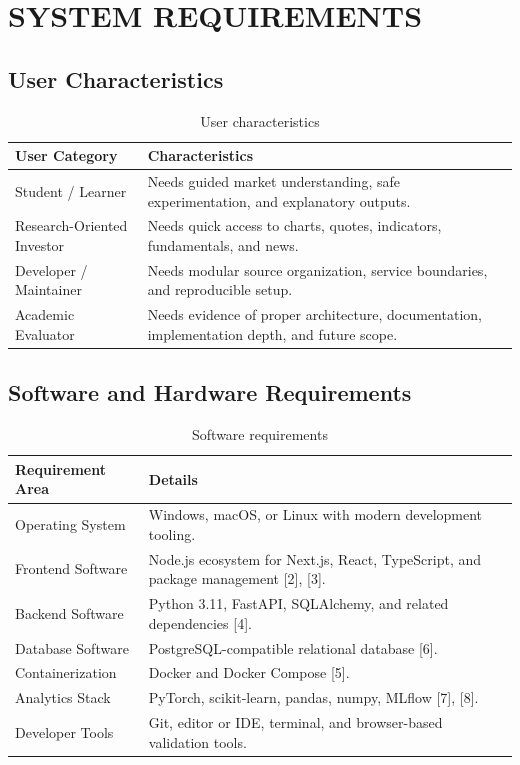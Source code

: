 \documentclass[12pt,a4paper]{report}
\begin{document}
\section{SYSTEM REQUIREMENTS}
\subsection{User Characteristics}
\begin{table}[H]
\centering
\caption{User characteristics}
\begin{tabularx}{\textwidth}{>{\raggedright\arraybackslash}p{1.9in} X}
\toprule
\textbf{User Category} & \textbf{Characteristics} \\
\midrule
Student / Learner & Needs guided market understanding, safe experimentation, and explanatory outputs. \\
Research-Oriented Investor & Needs quick access to charts, quotes, indicators, fundamentals, and news. \\
Developer / Maintainer & Needs modular source organization, service boundaries, and reproducible setup. \\
Academic Evaluator & Needs evidence of proper architecture, documentation, implementation depth, and future scope. \\
\bottomrule
\end{tabularx}
\end{table}

\subsection{Software and Hardware Requirements}
\begin{table}[H]
\centering
\caption{Software requirements}
\begin{tabularx}{\textwidth}{>{\raggedright\arraybackslash}p{2in} X}
\toprule
\textbf{Requirement Area} & \textbf{Details} \\
\midrule
Operating System & Windows, macOS, or Linux with modern development tooling. \\
Frontend Software & Node.js ecosystem for Next.js, React, TypeScript, and package management [2], [3]. \\
Backend Software & Python 3.11, FastAPI, SQLAlchemy, and related dependencies [4]. \\
Database Software & PostgreSQL-compatible relational database [6]. \\
Containerization & Docker and Docker Compose [5]. \\
Analytics Stack & PyTorch, scikit-learn, pandas, numpy, MLflow [7], [8]. \\
Developer Tools & Git, editor or IDE, terminal, and browser-based validation tools. \\
\bottomrule
\end{tabularx}
\end{table}
\end{document}
